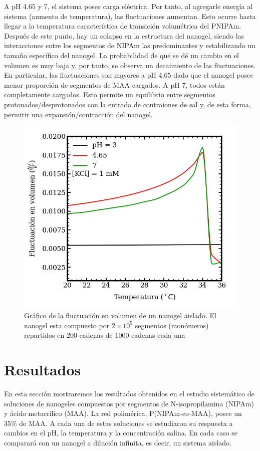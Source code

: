 	A pH 4.65 y 7, el sistema posee carga el\'ectrica. Por tanto, al agregarle energ\'ia al sistema (aumento de temperatura), las fluctuaciones aumentan. Esto ocurre hasta llegar a la temperatura caracter\'istica de transici\'on volum\'etrica del PNIPAm. Despu\'es de este punto, hay un colapso en la estructura del nanogel, siendo las interacciones entre los segmentos de NIPAm las predominantes y estabilizando un tama\~no espec\'ifico del nanogel.
	La probabilidad de que se d\'e un cambio en el volumen es muy baja y, por tanto, se observa un decaimiento de las fluctuaciones.
	En particular, las fluctuaciones son mayores a pH 4.65 dado que el nanogel posee menor proporci\'on de segmentos de MAA cargados. A pH 7, todos est\'an completamente cargados. Esto permite un equilibrio entre segmentos protonados/desprotonados con la entrada de contraiones de sal y, de esta forma, permitir una expansi\'on/contracci\'on del nanogel.
	
	
	
	\begin{figure}
		\centering
		\includegraphics[width=0.45\linewidth]{Figures/graph-mc/fluct-T.png}
		\caption{Gr\'afico de la fluctuaci\'on en volumen de un nanogel aislado. El nanogel esta compuesto por $2\times 10^5$ segmentos (mon\'omeros) repartidos en 200 cadenas de 1000 cadenas cada una}
		\label{fig:mc:fluct-T}
	\end{figure}
	
	
	\section{Resultados}
	
	En esta secci\'on mostraremos los resultados obtenidos en el estudio sistem\'atico de soluciones de nanogeles compuestos por segmentos de N-isopropilamina (NIPAm) y \'acido metacr\'ilico (MAA). La red polim\'erica, P(NIPAm-co-MAA), posee un 35\% de MAA.
	A cada una de estas soluciones se estudiaron su respuesta a cambios en el pH, la temperatura y la concentraci\'on salina. En cada caso se comparar\'a con un nanogel a diluci\'on infinita, es decir, un sistema aislado.
	
